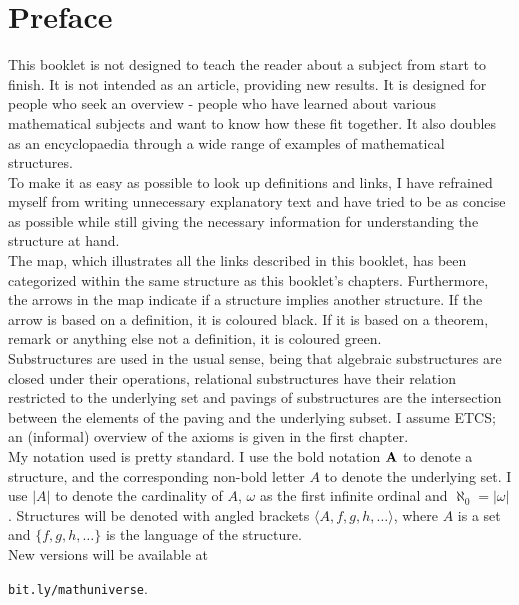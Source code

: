 \chapter*{Preface}
\thispagestyle{fancy}
This booklet is not designed to teach the reader about a subject from start to finish. It is not intended as an article, providing new results. It is designed for people who seek an overview - people who have learned about various mathematical subjects and want to know how these fit together. It also doubles as an encyclopaedia through a wide range of examples of mathematical structures.\\

To make it as easy as possible to look up definitions and links, I have refrained myself from writing unnecessary explanatory text and have tried to be as concise as possible while still giving the necessary information for understanding the structure at hand.\\

The map, which illustrates all the links described in this booklet, has been categorized within the same structure as this booklet's chapters. Furthermore, the arrows in the map indicate if a structure implies another structure. If the arrow is based on a definition, it is coloured black. If it is based on a theorem, remark or anything else not a definition, it is coloured green.\\

Substructures are used in the usual sense, being that algebraic substructures are closed under their operations, relational substructures have their relation restricted to the underlying set and pavings of substructures are the intersection between the elements of the paving and the underlying subset. I assume ETCS; an (informal) overview of the axioms is given in the first chapter.\\

My notation used is pretty standard. I use the bold notation ${\bf A}$ to denote a structure, and the corresponding non-bold letter $A$ to denote the underlying set. I use $|A|$ to denote the cardinality of $A$, $\omega$ as the first infinite ordinal and $\aleph_0=|\omega|$. Structures will be denoted with angled brackets $\langle A,f,g,h,\hdots\rangle$, where $A$ is a set and $\{f,g,h,\hdots\}$ is the language of the structure.\\

New versions will be available at
\begin{center}
\texttt{bit.ly/mathuniverse}.
\end{center}